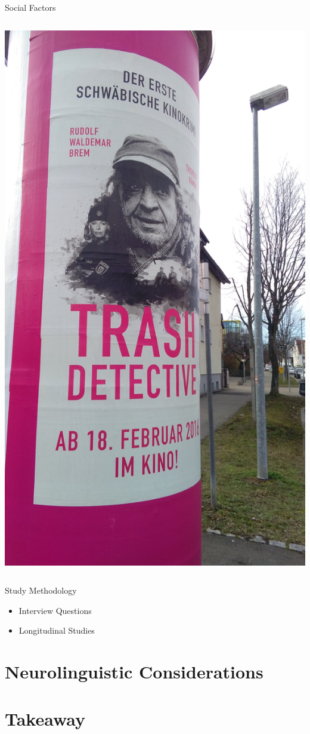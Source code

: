\documentclass{beamer}
\begin{document}
\begin{frame}{Social Factors}
\begin{columns}
      \includegraphics[scale=0.05]{trash_detective.jpg}
  \end{columns}
\end{frame}

\begin{frame}{Study Methodology}
    \begin{itemize}
        \item Interview Questions
        \item Longitudinal Studies
    \end{itemize}
\end{frame}

\section{Neurolinguistic Considerations}

\section{Takeaway}
\end{document}
